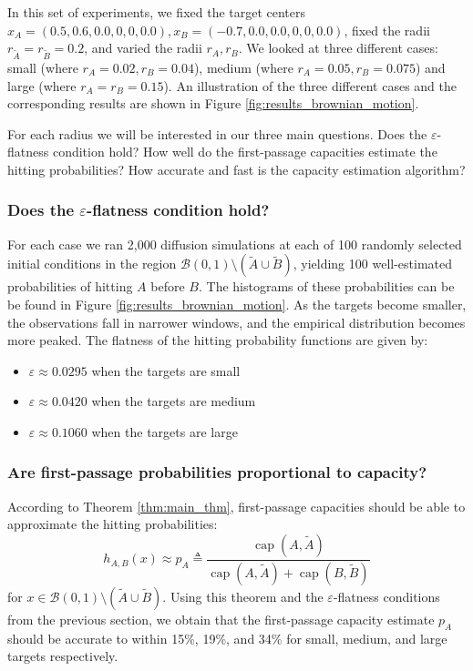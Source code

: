 \documentclass[12pt, nofootinbib,english, amsmath, amssymb, aps, priprint, graphicx,floatfix]{revtex4-1}
\theoremstyle{plain}
\theoremstyle{definition}
\theoremstyle{plain}
\newcommand{\capac}[2]{\ensuremath{\operatorname{cap}}(#1,#2)}
\newcommand{\tA}{{\tilde A}}
\newcommand{\tB}{{\tilde B}}
\begin{document}
In this set of experiments, we fixed the target centers $x_A=(0.5,0.6,0.0,0,0,0.0), x_B=(-0.7,0.0,0.0,0,0,0.0)$, fixed the radii $r_\tA=r_\tB=0.2$, and varied the radii $r_A,r_B$.  We looked at three different cases: small (where $r_A=0.02, r_B=0.04$), medium (where $r_A=0.05, r_B=0.075$) and large (where $r_A=r_B=0.15$). An illustration of the three different cases and the corresponding results are shown in Figure \ref{fig:results_brownian_motion}.  

For each radius we will be interested in our three main questions.  Does the $\varepsilon$-flatness condition hold?  How well do the first-passage capacities estimate the hitting probabilities?  How accurate and fast is the capacity estimation algorithm?

\subsubsection{Does the $\varepsilon$-flatness condition hold?}
\label{sec:toy_constant}
For each case we ran 2,000 diffusion simulations at each of 100 randomly selected initial conditions in the region $\mathcal{B}(0, 1) \setminus (\tilde{A} \cup \tilde{B})$, yielding 100 well-estimated probabilities of hitting $A$ before $B$. The histograms of these probabilities can be be found in Figure \ref{fig:results_brownian_motion}. As the targets become smaller, the observations fall in narrower windows, and the empirical distribution becomes more peaked. The flatness of the hitting probability functions are given by:
\begin{itemize}
    \item $\varepsilon\approx 0.0295$ when the targets are small
    \item $\varepsilon\approx 0.0420$ when the targets are medium
    \item $\varepsilon\approx 0.1060$ when the targets are large
\end{itemize}

\subsubsection{Are first-passage probabilities proportional to capacity?}
\label{sec:toy_capacity}
According to Theorem \ref{thm:main_thm}, first-passage capacities should be able to approximate the hitting probabilities:
\begin{equation}
\label{eqn:capacity_ratio}
h_{A,B}(x) \approx p_A \triangleq \frac{\capac{A}{\tA}}{\capac{A}{\tA}+\capac{B}{\tB}}
\end{equation}
for $x\in\mathcal{B}(0, 1) \setminus (\tilde{A} \cup \tilde{B})$.  Using this theorem and the $\varepsilon$-flatness conditions from the previous section, we obtain that the first-passage capacity estimate $p_A$ should be accurate to within 15\%, 19\%, and 34\% for small, medium, and large targets respectively.  
\end{document}
